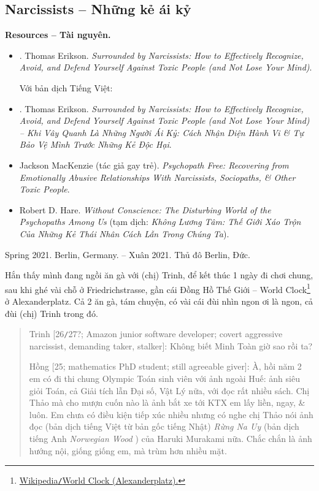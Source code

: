 \documentclass[12pt,oneside]{book}
\begin{document}
\subsection{Narcissists -- Những kẻ ái kỷ}
{\bf \textsf{Resources -- Tài nguyên.}}
\begin{itemize}
	\item \cite{Erikson_narcisisst}. {\sc Thomas Erikson}. {\it Surrounded by Narcissists: How to Effectively Recognize, Avoid, and Defend Yourself Against Toxic People (and Not Lose Your Mind)}.
	
	Với bản dịch Tiếng Việt:
	\item \cite{Erikson_narcisisst_VN}. {\sc Thomas Erikson}. {\it Surrounded by Narcissists: How to Effectively Recognize, Avoid, and Defend Yourself Against Toxic People (and Not Lose Your Mind) -- Khi Vây Quanh Là Những Người Ái Kỷ: Cách Nhận Diện Hành Vi \& Tự Bảo Vệ Mình Trước Những Kẻ Độc Hại}.
	\item \cite{MacKenzie2015} {\sc Jackson MacKenzie} (tác giả gay trẻ). {\it Psychopath Free: Recovering from Emotionally Abusive Relationships With Narcissists, Sociopaths, \& Other Toxic People}.
	\item \cite{Hare1999} {\sc Robert D. Hare}. {\it Without Conscience: The Disturbing World of the Psychopaths Among Us} (tạm dịch: {\it Không Lương Tâm: Thế Giới Xáo Trộn Của Những Kẻ Thái Nhân Cách Lẫn Trong Chúng Ta}).
\end{itemize}
\begin{flushright}
	Spring 2021. Berlin, Germany. -- Xuân 2021. Thủ đô Berlin, Đức.
\end{flushright}
Hắn thấy mình đang ngồi ăn gà với (chị) Trinh, để kết thúc 1 ngày đi chơi chung, sau khi ghé vài chỗ ở Friedrichstrasse, gần cái Đồng Hồ Thế Giới -- World Clock\footnote{\href{https://en.wikipedia.org/wiki/World_Clock_(Alexanderplatz)}{Wikipedia{\tt/}World Clock (Alexanderplatz).}} ở Alexanderplatz. Cả 2 ăn gà, tám chuyện, có vài cái đùi nhìn ngon ơi là ngon, cả đùi (chị) Trinh trong đó. 
\begin{quote}
	{\sf Trinh [26{\tt/}27?; Amazon junior software developer; covert aggressive narcissist, demanding taker, stalker]}: Không biết Minh Toàn giờ sao rồi ta?
	
	{\sf Hồng [25; mathematics PhD student; still agreeable giver]}: À, hồi năm 2 em có đi thi chung Olympic Toán sinh viên với ảnh ngoài Huế: ảnh siêu giỏi Toán, cả Giải tích lẫn Đại số, Vật Lý nữa, với đọc rất nhiều sách. Chị Thảo mà cho mượn cuốn nào là ảnh bắt xe tới KTX em lấy liền, ngay, \& luôn. Em chưa có điều kiện tiếp xúc nhiều nhưng có nghe chị Thảo nói ảnh đọc (bản dịch tiếng Việt từ bản gốc tiếng Nhật) {\it Rừng Na Uy} \cite{Murakami_rung_Na_Uy} (bản dịch tiếng Anh {\it Norwegian Wood} \cite{Murakami_Norwegian_wood}) của {\sc Haruki Murakami} nữa. Chắc chắn là ảnh hướng nội, giống giống em, mà trùm hơn nhiều mặt.
\end{quote}
\end{document}
